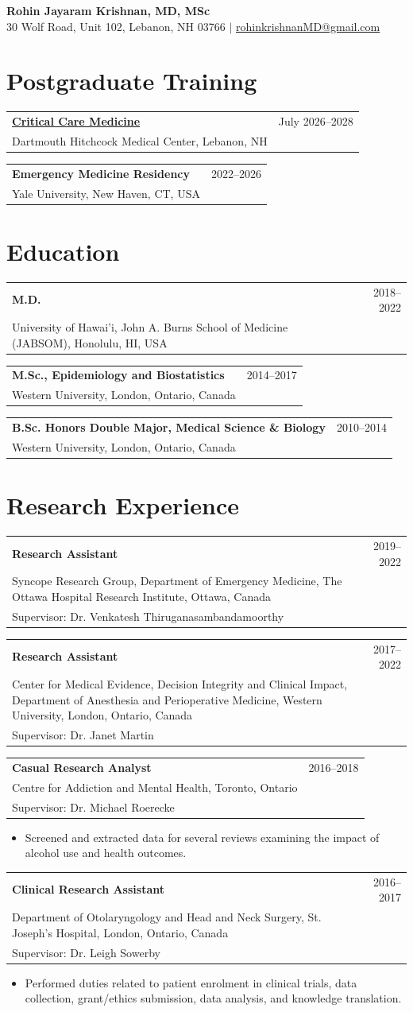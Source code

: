 \documentclass[10.5pt,letterpaper]{article}
\makeatletter
\newcommand{\cvitem}[3]{\begin{tabularx}{\textwidth}{@{}Xr@{}}\textbf{#1} & #2\\ #3 & \end{tabularx}\vspace{3pt}}
\makeatother
\begin{document}
\begin{center}
{\LARGE\bfseries Rohin Jayaram Krishnan, MD, MSc}\\[4pt]
30 Wolf Road, Unit 102, Lebanon, NH 03766 \quad $\vert$ \quad
\href{mailto:rohinkrishnanMD@gmail.com}{rohinkrishnanMD@gmail.com}
\end{center}

\section{Postgraduate Training}
\cvitem{\href{https://gme.dartmouth-hitchcock.org/critical-care-internal}{Critical Care Medicine}}{July 2026--2028}{Dartmouth Hitchcock Medical Center, Lebanon, NH}
\cvitem{Emergency Medicine Residency}{2022--2026}{Yale University, New Haven, CT, USA}

\section{Education}
\cvitem{M.D.}{2018--2022}{University of Hawai'i, John A. Burns School of Medicine (JABSOM), Honolulu, HI, USA}
\cvitem{M.Sc., Epidemiology and Biostatistics}{2014--2017}{Western University, London, Ontario, Canada}
\cvitem{B.Sc. Honors Double Major, Medical Science \& Biology}{2010--2014}{Western University, London, Ontario, Canada}

\section{Research Experience}
\cvitem{Research Assistant}{2019--2022}{Syncope Research Group, Department of Emergency Medicine, The Ottawa Hospital Research Institute, Ottawa, Canada\\Supervisor: Dr. Venkatesh Thiruganasambandamoorthy}
\cvitem{Research Assistant}{2017--2022}{Center for Medical Evidence, Decision Integrity and Clinical Impact, Department of Anesthesia and Perioperative Medicine, Western University, London, Ontario, Canada\\Supervisor: Dr. Janet Martin}
\cvitem{Casual Research Analyst}{2016--2018}{Centre for Addiction and Mental Health, Toronto, Ontario\\Supervisor: Dr. Michael Roerecke}
\begin{itemize}\item Screened and extracted data for several reviews examining the impact of alcohol use and health outcomes.\end{itemize}
\cvitem{Clinical Research Assistant}{2016--2017}{Department of Otolaryngology and Head and Neck Surgery, St. Joseph's Hospital, London, Ontario, Canada\\Supervisor: Dr. Leigh Sowerby}
\begin{itemize}\item Performed duties related to patient enrolment in clinical trials, data collection, grant/ethics submission, data analysis, and knowledge translation.\end{itemize}
\end{document}
